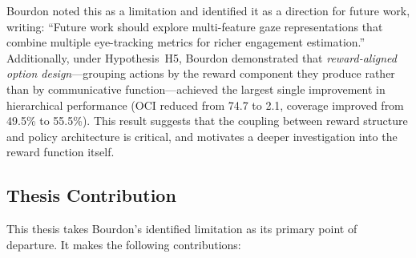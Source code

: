\documentclass[12pt,a4paper]{article}
\begin{document}
Bourdon noted this as a limitation and identified it as a direction for future work, writing: ``Future work should explore multi-feature gaze representations that combine multiple eye-tracking metrics for richer engagement estimation.'' Additionally, under Hypothesis~H5, Bourdon demonstrated that \emph{reward-aligned option design}---grouping actions by the reward component they produce rather than by communicative function---achieved the largest single improvement in hierarchical performance (OCI reduced from 74.7 to 2.1, coverage improved from 49.5\% to 55.5\%). This result suggests that the coupling between reward structure and policy architecture is critical, and motivates a deeper investigation into the reward function itself.

\subsection{Thesis Contribution}

This thesis takes Bourdon's identified limitation as its primary point of departure. It makes the following contributions:
\end{document}
